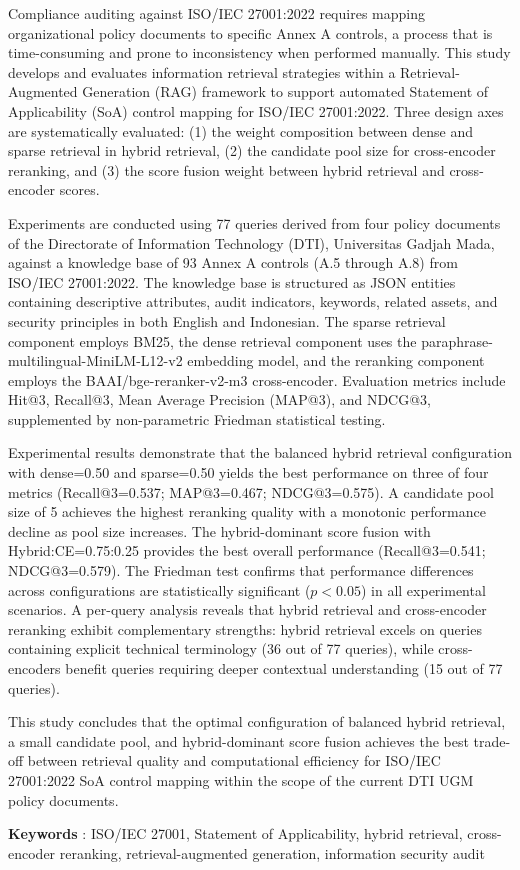 Compliance auditing against ISO/IEC 27001:2022 requires mapping organizational policy documents to specific Annex A controls, a process that is time-consuming and prone to inconsistency when performed manually. This study develops and evaluates information retrieval strategies within a Retrieval-Augmented Generation (RAG) framework to support automated Statement of Applicability (SoA) control mapping for ISO/IEC 27001:2022. Three design axes are systematically evaluated: (1) the weight composition between dense and sparse retrieval in hybrid retrieval, (2) the candidate pool size for cross-encoder reranking, and (3) the score fusion weight between hybrid retrieval and cross-encoder scores.

Experiments are conducted using 77 queries derived from four policy documents of the Directorate of Information Technology (DTI), Universitas Gadjah Mada, against a knowledge base of 93 Annex A controls (A.5 through A.8) from ISO/IEC 27001:2022. The knowledge base is structured as JSON entities containing descriptive attributes, audit indicators, keywords, related assets, and security principles in both English and Indonesian. The sparse retrieval component employs BM25, the dense retrieval component uses the paraphrase-multilingual-MiniLM-L12-v2 embedding model, and the reranking component employs the BAAI/bge-reranker-v2-m3 cross-encoder. Evaluation metrics include Hit@3, Recall@3, Mean Average Precision (MAP@3), and NDCG@3, supplemented by non-parametric Friedman statistical testing.

Experimental results demonstrate that the balanced hybrid retrieval configuration with dense=0.50 and sparse=0.50 yields the best performance on three of four metrics (Recall@3=0.537; MAP@3=0.467; NDCG@3=0.575). A candidate pool size of 5 achieves the highest reranking quality with a monotonic performance decline as pool size increases. The hybrid-dominant score fusion with Hybrid:CE=0.75:0.25 provides the best overall performance (Recall@3=0.541; NDCG@3=0.579). The Friedman test confirms that performance differences across configurations are statistically significant ($p < 0.05$) in all experimental scenarios. A per-query analysis reveals that hybrid retrieval and cross-encoder reranking exhibit complementary strengths: hybrid retrieval excels on queries containing explicit technical terminology (36 out of 77 queries), while cross-encoders benefit queries requiring deeper contextual understanding (15 out of 77 queries).

This study concludes that the optimal configuration of balanced hybrid retrieval, a small candidate pool, and hybrid-dominant score fusion achieves the best trade-off between retrieval quality and computational efficiency for ISO/IEC 27001:2022 SoA control mapping within the scope of the current DTI UGM policy documents.

\noindent\textbf{Keywords} : ISO/IEC 27001, Statement of Applicability, hybrid retrieval, cross-encoder reranking, retrieval-augmented generation, information security audit
